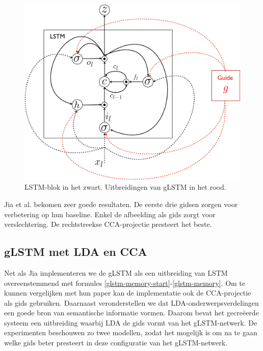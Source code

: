 \begin{figure}[tb][h]
	\centering
	\includegraphics[width=\linewidth]{Images/glstm.pdf}
	\caption{LSTM-blok in het zwart. Uitbreidingen van gLSTM in het rood.}
	\label{fig:glstm}
\end{figure}

Jia et al. bekomen zeer goede resultaten. De eerste drie gidsen zorgen voor verbetering op hun baseline. Enkel de afbeelding als gids zorgt voor verslechtering. De rechtstreekse CCA-projectie presteert het beste.

\subsection{gLSTM met LDA en CCA}
Net als Jia implementeren we de gLSTM als een uitbreiding van LSTM overeenstemmend met formules \eqref{glstm-memory-start}-\eqref{glstm-memory}.
Om te kunnen vergelijken met hun paper kan de implementatie ook de CCA-projectie als gids gebruiken.
Daarnaast veronderstellen we dat LDA-onderwerpsverdelingen een goede bron van semantische informatie vormen. Daarom bevat het gecre\"eerde systeem een uitbreiding waarbij LDA de gids vormt van het gLSTM-netwerk.
De experimenten beschouwen zo twee modellen, zodat het mogelijk is om na te gaan welke gids beter presteert in deze configuratie van het gLSTM-netwerk.

